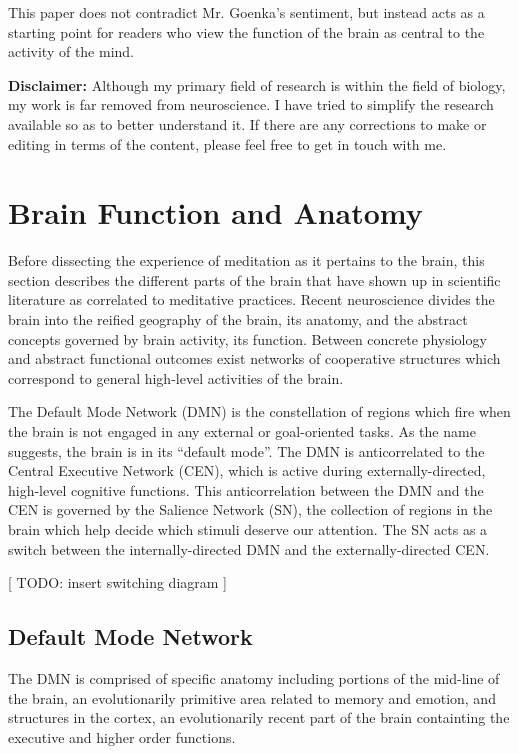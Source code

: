 \documentclass[twocolumn]{article}
\begin{document}
This paper does not contradict Mr. Goenka's sentiment, but instead acts as a starting
point for readers who view the function of the brain as central to the activity of
the mind.

\textbf{Disclaimer:} Although my primary field of research is within the field of
biology, my work is far removed
from neuroscience. I have tried to simplify the research available so as to better
understand it. If there are any corrections to make or editing in terms of the
content, please feel free to get in touch with me.


\section{Brain Function and Anatomy}

Before dissecting the experience of meditation as it pertains to the brain, this
section describes the different parts of the brain that have shown up in
scientific literature as correlated to meditative practices. Recent neuroscience divides the
brain into the reified geography of the brain, its anatomy, and the abstract concepts
governed by brain activity, its function. Between concrete physiology and abstract
functional outcomes exist networks of cooperative structures which correspond to general
high-level activities of the brain.

The Default Mode Network (DMN) is the constellation of regions which fire when
the brain is not engaged in any external or goal-oriented
tasks. As the name suggests, the brain is in its ``default
mode''. \cite{defaultnetworkadaptive} The DMN is anticorrelated to the Central Executive
Network (CEN), which is active during externally-directed, high-level cognitive
functions. \cite{saliencenetwork} This anticorrelation between the DMN and the CEN is
governed by the Salience Network (SN), the collection of regions in the brain which
help decide which stimuli deserve our attention. The SN acts as a switch between the
internally-directed DMN and the externally-directed CEN. \cite{saliencenetwork}

[ TODO: insert switching diagram ]


\subsection{Default Mode Network}

The DMN is comprised of specific anatomy including portions of the mid-line of the
brain, an evolutionarily primitive area related to memory and emotion, and
structures in the cortex, an evolutionarily recent part of the brain containting the
executive and higher order functions. \cite{defaultnetworkanatomy}
\end{document}
